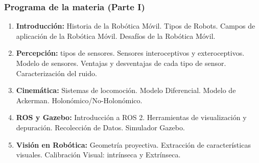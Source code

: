 \begin{frame}
	\frametitle{Programa de la materia (Parte I)}
	\footnotesize
	\begin{enumerate}
		\item {\bf Introducción:} Historia de la Robótica Móvil. Tipos de Robots. Campos de aplicación de la Robótica Móvil. Desafíos de la Robótica Móvil.
		
		\item {\bf Percepción:} tipos de sensores. Sensores interoceptivos y exteroceptivos. Modelo de sensores. Ventajas y desventajas de cada tipo de sensor. Caracterización del ruido.
		
		\item {\bf Cinemática:} Sistemas de locomoción. Modelo Diferencial. Modelo de Ackerman. Holonómico/No-Holonómico.
		
		\item {\bf ROS y Gazebo:} Introducción a ROS 2. Herramientas de visualización y depuración. Recolección de Datos. Simulador Gazebo.
		
		\item {\bf Visión en Robótica:} Geometría proyectiva. Extracción de características visuales. Calibración Visual: intrínseca y Extrínseca. 
		
	\end{enumerate}

\end{frame}

